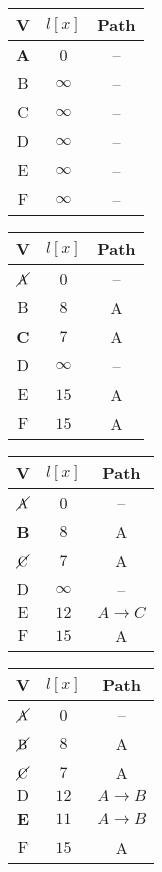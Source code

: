 \documentclass[legalpaper,10pt]{article}
\begin{document}
\begin{enumerate}
\begin{enumerate}
  \begin{center}
    \begin{tabular}{|c|c|c|}
      \hline
      V&$l[x]$&Path\\
      \hline
      \textbf{A} & 0 & -- \\
      $\text{B}$ & $\infty$ & -- \\
      $\text{C}$ & $\infty$ & -- \\
      $\text{D}$ & $\infty$ & -- \\
      $\text{E}$ & $\infty$ & -- \\
      $\text{F}$ & $\infty$ & -- \\
      \hline
    \end{tabular}
    \quad
    \begin{tabular}{|c|c|c|}
      \hline
      V&$l[x]$&Path\\
      \hline
      $\cancel{\text{A}}$ & 0 & -- \\
      $\text{B}$ & $8$ & A         \\
      \textbf{C} & $7$ & A         \\
      $\text{D}$ & $\infty$ & --   \\
      $\text{E}$ & $15$ & A        \\
      $\text{F}$ & $15$ & A        \\
      \hline
    \end{tabular}
    \quad
    \begin{tabular}{|c|c|c|}
      \hline
      V&$l[x]$&Path\\
      \hline
      $\cancel{\text{A}}$ & 0 & -- \\
      \textbf{B} & $8$ & A         \\
      $\cancel{\text{C}}$ & $7$ & A         \\
      $\text{D}$ & $\infty$ & --   \\
      $\text{E}$ & $12$ & $A \rightarrow C$        \\
      $\text{F}$ & $15$ & A        \\
      \hline
    \end{tabular}
    \quad
    \begin{tabular}{|c|c|c|}
      \hline
      V&$l[x]$&Path\\
      \hline
      $\cancel{\text{A}}$ & 0 & -- \\
      $\cancel{\text{B}}$ & $8$ & A         \\
      $\cancel{\text{C}}$ & $7$ & A         \\
      $\text{D}$ & $12$ & $A \rightarrow B$   \\
      \textbf{E} & $11$ & $A \rightarrow B$        \\
      $\text{F}$ & $15$ & A        \\
      \hline
    \end{tabular}


\end{center}
\end{enumerate}
\end{enumerate}
\end{document}
